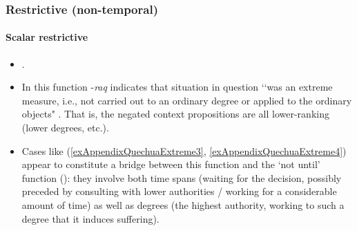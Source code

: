 \subsubsection{Restrictive (non-temporal)}
\paragraph{Scalar restrictive}
\label{appendixQuechuaExtraordinary}
\begin{itemize}
	\item \textcite[389]{Weber1989}.
	\item In this function \mbox{-\textit{raq}} indicates that situation in question \lq\lq was an extreme measure, i.e., not carried out to an ordinary degree or applied to the ordinary ob­jects" \parencite[389]{Weber1989}. That is, the negated context propositions are all lower-ranking (lower degrees, etc.).
	\item Cases like (\ref{exAppendixQuechuaExtreme3}, \ref{exAppendixQuechuaExtreme4}) appear to constitute a bridge between this function and the \lq not until' function (): they involve both time spans (waiting for the decision, possibly preceded by consulting with lower authorities / working for a considerable amount of time) as well as degrees  (the highest authority, working to such a degree that it induces suffering).
\end{itemize}

